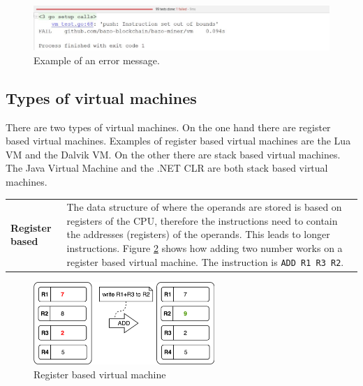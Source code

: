 \begin{figure}[H]
	\begin{center}
	\includegraphics[width=\textwidth]{./images/push-test-failure}
	\caption{Example of an error message.}
	\label{pushtestfailure}
	\end{center}
\end{figure}

\subsection{Types of virtual machines}
There are two types of virtual machines. On the one hand there are register based virtual machines. Examples of register based virtual machines are the Lua VM and the Dalvik VM. On the other there are stack based virtual machines. The Java Virtual Machine and the .NET CLR are both stack based virtual machines. \cite{stackvsregistervm}

\begin{tabular}[t]{ p{3cm} p{12.5cm}}
\raggedright
\textbf{Register based} &
The data structure of where the operands are stored is based on registers of the CPU, therefore the instructions need to contain the addresses (registers) of the operands. This leads to longer instructions. Figure \ref{register vm} shows how adding two number works on a register based virtual machine. \cite{stackvsregistervm} The instruction is \texttt{ADD R1 R3 R2}.
\end{tabular}
\begin{figure}[H]
	\begin{center}
	\includegraphics[width=0.61\textwidth]{./images/register-example}
	\caption{Register based virtual machine}
	\label{register vm}
	\end{center}
\end{figure}


